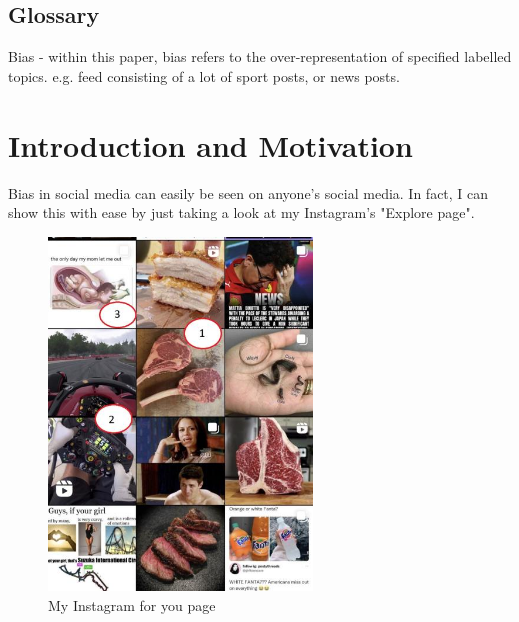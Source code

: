 \documentclass[a4paper,fleqn,10pt]{article}
\begin{document}


\pagestyle{plain}

\subsection{Glossary}
Bias - within this paper, bias refers to the over-representation of specified labelled topics. e.g. feed consisting of a lot of sport
posts, or news posts.

\section{Introduction and Motivation}
\label{sec:intro}


Bias in social media can easily be seen on anyone's social media. In fact, I can show this with ease by just taking a look at my
Instagram's "Explore page".
\begin{figure}[htbp]
    \centering
    \includegraphics[width=70mm]{../images/tweet-example.png}
    \caption{My Instagram for you page}
    \label{fig:ig4u}
\end{figure}
\end{document}
